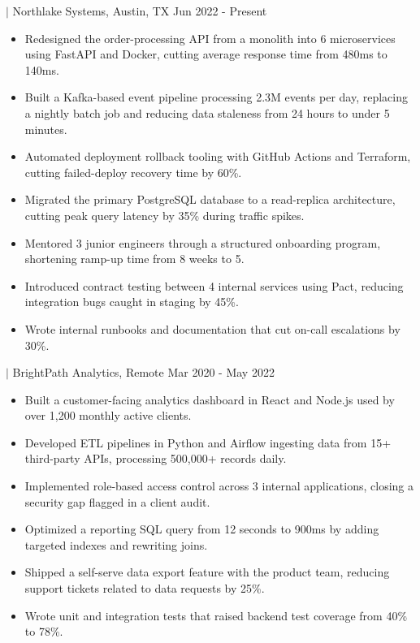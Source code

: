 \documentclass[11pt]{article}
\newcommand{\job}[4]{%
  \vspace{4pt}{\bfseries #1} $\vert$ #2#3 \hfill #4\par}
\begin{document}
\job{Backend Engineer}{Northlake Systems}{, Austin, TX}{Jun 2022 - Present}
\begin{itemize}
  \item Redesigned the order-processing API from a monolith into 6 microservices
        using FastAPI and Docker, cutting average response time from 480ms to 140ms.
  \item Built a Kafka-based event pipeline processing 2.3M events per day,
        replacing a nightly batch job and reducing data staleness from 24 hours
        to under 5 minutes.
  \item Automated deployment rollback tooling with GitHub Actions and Terraform,
        cutting failed-deploy recovery time by 60\%.
  \item Migrated the primary PostgreSQL database to a read-replica architecture,
        cutting peak query latency by 35\% during traffic spikes.
  \item Mentored 3 junior engineers through a structured onboarding program,
        shortening ramp-up time from 8 weeks to 5.
  \item Introduced contract testing between 4 internal services using Pact,
        reducing integration bugs caught in staging by 45\%.
  \item Wrote internal runbooks and documentation that cut on-call escalations
        by 30\%.
\end{itemize}

\job{Software Engineer}{BrightPath Analytics}{, Remote}{Mar 2020 - May 2022}
\begin{itemize}
  \item Built a customer-facing analytics dashboard in React and Node.js used
        by over 1,200 monthly active clients.
  \item Developed ETL pipelines in Python and Airflow ingesting data from
        15+ third-party APIs, processing 500,000+ records daily.
  \item Implemented role-based access control across 3 internal applications,
        closing a security gap flagged in a client audit.
  \item Optimized a reporting SQL query from 12 seconds to 900ms by adding
        targeted indexes and rewriting joins.
  \item Shipped a self-serve data export feature with the product team,
        reducing support tickets related to data requests by 25\%.
  \item Wrote unit and integration tests that raised backend test coverage
        from 40\% to 78\%.
\end{itemize}
\end{document}
